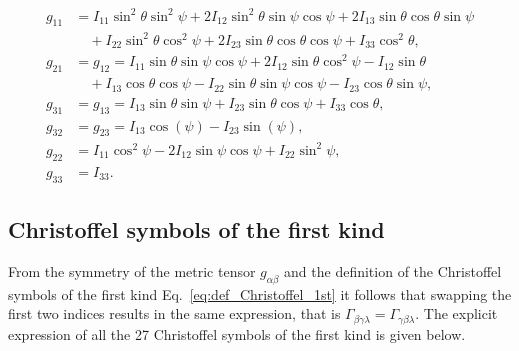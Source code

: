 \documentclass[pdflatex,sn-mathphys-num]{sn-jnl}%
\theoremstyle{thmstyleone}%
\theoremstyle{thmstyletwo}%
\theoremstyle{thmstylethree}%
\begin{document}
\begin{appendices}
\begin{align}
    g_{11} & = I_{11} \sin^2\theta \sin^2\psi
    + 2 I_{12} \sin^2\theta \sin\psi \cos\psi
    + 2 I_{13} \sin\theta \cos\theta \sin\psi \nonumber \\
    & \quad + I_{22} \sin^2\theta \cos^2\psi
    + 2 I_{23} \sin\theta \cos\theta \cos\psi
    + I_{33} \cos^2\theta, \nonumber \\
    g_{21} &= g_{12}
    = I_{11} \sin\theta \sin\psi \cos\psi
    + 2 I_{12} \sin\theta \cos^2\psi
    - I_{12} \sin\theta \nonumber \\
    & \quad + I_{13} \cos\theta \cos\psi
    - I_{22} \sin\theta \sin\psi \cos\psi
    - I_{23} \cos\theta \sin\psi, \nonumber \\
    g_{31} &= g_{13}
    = I_{13} \sin\theta \sin\psi
    + I_{23} \sin\theta \cos\psi
    + I_{33} \cos\theta, \nonumber \\
	g_{32}  &= g_{23}  = I_{13} \cos(\psi) - I_{23} \sin(\psi), \nonumber \\
    g_{22} & = I_{11} \cos^2\psi
    - 2 I_{12} \sin\psi \cos\psi
    + I_{22} \sin^2\psi, \nonumber \\
    g_{33} & = I_{33}.
\end{align}

\subsection{Christoffel symbols of the first kind} %

From the symmetry of the metric tensor $g_{\alpha\beta}$ and the definition of the Christoffel symbols of the first kind Eq.~\eqref{eq:def_Christoffel_1st} it follows that swapping the first two indices results in the same expression, that is
${\Gamma_{\beta\gamma\lambda} = \Gamma_{\gamma\beta\lambda} }$.
The explicit expression of all the 27 Christoffel symbols of the first kind is given below.


\end{appendices}
\end{document}
